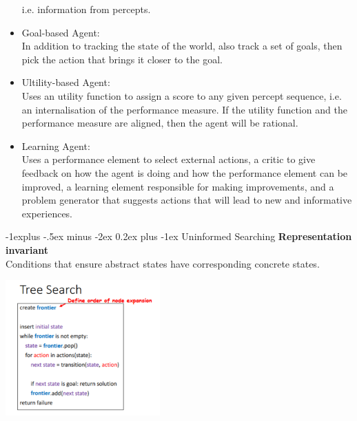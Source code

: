 \documentclass[10pt,landscape]{article}
\makeatletter
\renewcommand{\subsection}{\@startsection{subsection}{2}{0mm}%
                                {-1explus -.5ex minus -2ex}%
                                {0.2ex plus -1ex}%
                                {\normalfont\small\bfseries}}
\makeatother
\begin{document}
\begin{multicols}{3}
\begin{scriptsize}
\begin{itemize}
  i.e. information from percepts.
  \item Goal-based Agent:\\In addition to tracking the state of
  the world, also track a set of goals, then pick the action
  that brings it closer to the goal.
  \item Ultility-based Agent:\\Uses an utility function to assign
  a score to any given percept sequence, i.e. an internalisation of the performance measure. If the utility function and the performance measure are aligned, then the agent
 will be rational.
  \item Learning Agent:\\Uses a performance element to select
  external actions, a critic to give feedback on how the
  agent is doing and how the performance element can be
  improved, a learning element responsible for making improvements, and a problem generator that suggests actions that will lead to new and informative experiences.
\end{itemize}


\subsection{Uninformed Searching}
\textbf{Representation invariant}\\Conditions that ensure abstract states have corresponding concrete states.

\includegraphics*[height=5.2cm, width=0.8\linewidth]{tree_search.png}


\end{scriptsize}
\end{multicols}
\end{document}
